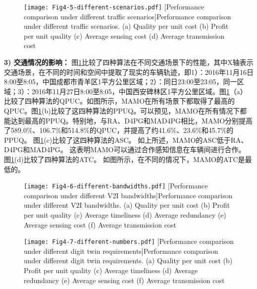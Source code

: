 \begin{figure}[h]
 \centering
 \texttt{[image: Fig4-5-different-scenarios.pdf]}
 [Performance comparison under different traffic scenarios]{Performance comparison under different traffic scenarios. (a) Quality per unit cost (b) Profit per unit quality (c) Average sensing cost (d) Average transmission cost}
 \label{fig 4-5}
\end{figure}

\textbf{3) 交通情况的影响：}
图\ref{fig 4-5}比较了四种算法在不同交通场景下的性能，其中X轴表示交通场景，在不同的时间和空间中提取了现实的车辆轨迹，即1）：2016年11月16日8:00至8:05，中国成都市青羊区1平方公里区域；2）：同日23:00至23:05，同一区域；3）：2016年11月27日8:00至8:05，中国西安碑林区1平方公里区域。图\ref{fig 4-5}（a）比较了四种算法的QPUC。如图所示，MAMO在所有场景下都取得了最高的QPUC。图\ref{fig 4-5}(b)比较了这四种算法的PPUQ。可以预见，MAMO在所有情况下都能达到最高的PPUQ。特别地，与RA、D4PG和MAD4PG相比，MAMO分别提高了589.0\%、106.7\%和514.8\%的QPUC，并提高了约41.6\%、23.6\%和45.7\%的PPUQ。
图\ref{fig 4-5}(c)比较了这四种算法的ASC。
如上所述，MAMO的ASC低于RA、D4PG和MAD4PG。
这表明MAMO可以通过合作感知信息在车辆间进行合作。
图\ref{fig 4-5}(d)比较了四种算法的ATC。
如图所示，在不同的情况下，MAMO的ATC是最低的。

\begin{figure}[h]
 \centering
 \texttt{[image: Fig4-6-different-bandwidths.pdf]}
 [Performance comparison under different V2I bandwidths]{Performance comparison under different V2I bandwidths. (a) Quality per unit cost (b) Profit per unit quality (c) Average timeliness (d) Average redundancy (e) Average sensing cost (f) Average transmission cost}
 \label{fig 4-6}
\end{figure}

\begin{figure}[h]
 \centering
 \texttt{[image: Fig4-7-different-numbers.pdf]}
 [Performance comparison under different digit twin requirements]{Performance comparison under different digit twin requirements. (a) Quality per unit cost (b) Profit per unit quality (c) Average timeliness (d) Average redundancy (e) Average sensing cost (f) Average transmission cost}
 \label{fig 4-7}
\end{figure}

